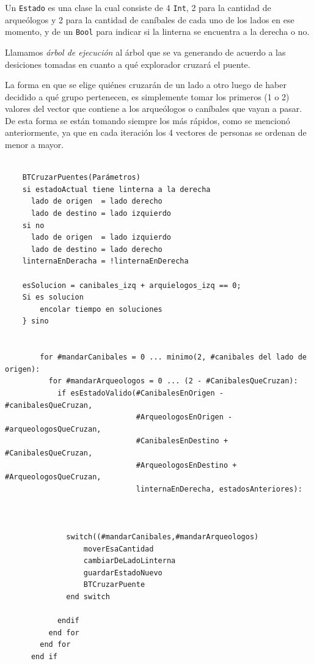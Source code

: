             Un \texttt{Estado} es una clase la cual consiste de 4 \texttt{Int}, 2 para la cantidad de arqueólogos y 2 para la cantidad de caníbales de cada uno de los lados en ese momento, y de un \texttt{Bool} para indicar si la linterna se encuentra a la derecha o no.

            Llamamos \emph{árbol de ejecución} al árbol que se va generando de acuerdo a las desiciones tomadas en cuanto a qué explorador cruzará el puente.

            La forma en que se elige quiénes cruzarán de un lado a otro luego de haber decidido a qué grupo pertenecen, es simplemente tomar los primeros (1 o 2) valores del vector que contiene a los arqueólogos o caníbales que vayan a pasar. De esta forma se están tomando siempre los más rápidos, como se mencionó anteriormente, ya que en cada iteración los 4 vectores de personas se ordenan de menor a mayor.

        \begin{codesnippet}
        \begin{verbatim}

    BTCruzarPuentes(Parámetros)
    si estadoActual tiene linterna a la derecha
      lado de origen  = lado derecho
      lado de destino = lado izquierdo
    si no
      lado de origen  = lado izquierdo
      lado de destino = lado derecho
    linternaEnDeracha = !linternaEnDerecha
    
    esSolucion = canibales_izq + arquielogos_izq == 0;
    Si es solucion
        encolar tiempo en soluciones
    } sino    


        for #mandarCanibales = 0 ... minimo(2, #canibales del lado de origen):
          for #mandarArqueologos = 0 ... (2 - #CanibalesQueCruzan):
            if esEstadoValido(#CanibalesEnOrigen - #canibalesQueCruzan,
                              #ArqueologosEnOrigen - #arqueologosQueCruzan,
                              #CanibalesEnDestino + #CanibalesQueCruzan,
                              #ArqueologosEnDestino + #ArqueologosQueCruzan,
                              linternaEnDerecha, estadosAnteriores):
              

              
              switch((#mandarCanibales,#mandarArqueologos)
                  moverEsaCantidad
                  cambiarDeLadoLinterna
                  guardarEstadoNuevo
                  BTCruzarPuente
              end switch

            endif  
          end for
        end for
      end if
        \end{verbatim}
        \end{codesnippet}

